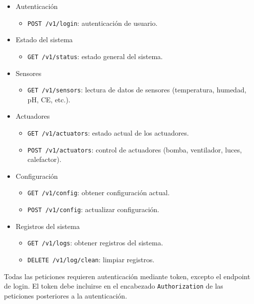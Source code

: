 \begin{itemize}
    \item Autenticación
    \begin{itemize}
        \item \texttt{POST /v1/login}: autenticación de usuario.
    \end{itemize}
    
    \item Estado del sistema
    \begin{itemize}
        \item \texttt{GET /v1/status}: estado general del sistema.
    \end{itemize}
    
    \item Sensores
    \begin{itemize}
        \item \texttt{GET /v1/sensors}: lectura de datos de sensores (temperatura, humedad, pH, CE, etc.).
    \end{itemize}
    
    \item Actuadores
    \begin{itemize}
        \item \texttt{GET /v1/actuators}: estado actual de los actuadores.
        \item \texttt{POST /v1/actuators}: control de actuadores (bomba, ventilador, luces, calefactor).
    \end{itemize}
    
    \item Configuración
    \begin{itemize}
        \item \texttt{GET /v1/config}: obtener configuración actual.
        \item \texttt{POST /v1/config}: actualizar configuración.
    \end{itemize}
    
    \item Registros del sistema
    \begin{itemize}
        \item \texttt{GET /v1/logs}: obtener registros del sistema.
        \item \texttt{DELETE /v1/log/clean}: limpiar registros.
    \end{itemize}
\end{itemize}

Todas las peticiones requieren autenticación mediante token, excepto el endpoint de login. El token debe incluirse en el encabezado \texttt{Authorization} de las peticiones posteriores a la autenticación.

